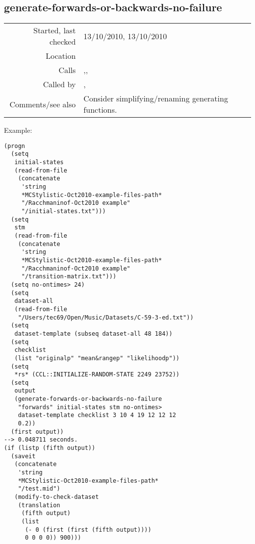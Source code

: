 \subsection*{generate-forwards-or-backwards-no-failure}\label{fun:generate-forwards-or-backwards-no-failure}

\vspace{0.3cm}
\begin{tabular}{r|p{8cm}}
Started, last checked & 13/10/2010, 13/10/2010 \\
Location & \nameref{sec:generating-beat-MNN-spacing-for-and-back} \\
Calls & \nameref{fun:generate-beat-MNN-spacing->},\newline \nameref{fun:generate-beat-MNN-spacing<-},\newline \nameref{fun:segments-strict} \\
Called by & \nameref{fun:generate-beat-MNN-spacing<->},\newline \nameref{fun:generate-beat-spacing-forced<->} \\
Comments/see also & Consider simplifying/renaming generating functions.
\end{tabular}

\vspace{0.5cm}
\noindent Example:
\begin{verbatim}
(progn
  (setq
   initial-states
   (read-from-file
    (concatenate
     'string
     *MCStylistic-Oct2010-example-files-path*
     "/Racchmaninof-Oct2010 example"
     "/initial-states.txt")))
  (setq
   stm
   (read-from-file
    (concatenate
     'string
     *MCStylistic-Oct2010-example-files-path*
     "/Racchmaninof-Oct2010 example"
     "/transition-matrix.txt")))
  (setq no-ontimes> 24)
  (setq
   dataset-all
   (read-from-file
    "/Users/tec69/Open/Music/Datasets/C-59-3-ed.txt"))
  (setq
   dataset-template (subseq dataset-all 48 184))
  (setq
   checklist
   (list "originalp" "mean&rangep" "likelihoodp"))
  (setq
   *rs* (CCL::INITIALIZE-RANDOM-STATE 2249 23752))
  (setq
   output
   (generate-forwards-or-backwards-no-failure
    "forwards" initial-states stm no-ontimes>
    dataset-template checklist 3 10 4 19 12 12 12
    0.2))
  (first output))
--> 0.048711 seconds.
(if (listp (fifth output))
  (saveit
   (concatenate
    'string
    *MCStylistic-Oct2010-example-files-path*
    "/test.mid")
   (modify-to-check-dataset
    (translation
     (fifth output)
     (list
      (- 0 (first (first (fifth output))))
      0 0 0 0)) 900)))
\end{verbatim}

